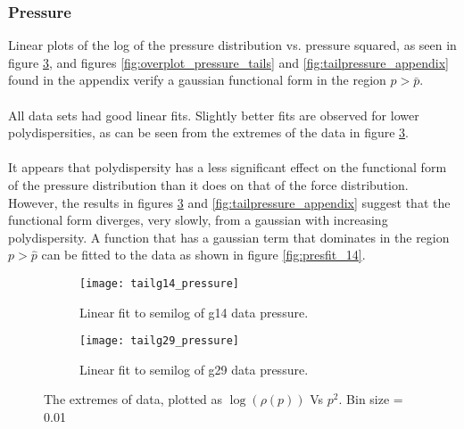\documentclass[12pt] {article} %
\begin{document}
		
		\subsubsection{Pressure}		
		Linear plots of the log of the pressure distribution vs. pressure squared, as seen in figure \ref{fig:fits_pressure}, and  figures \ref{fig:overplot_pressure_tails} and \ref{fig:tailpressure_appendix} found in the appendix verify a gaussian functional form in the region $p>\bar{p}$. \\
		\\
		All data sets had good linear fits. Slightly better fits are observed for lower polydispersities, as can be seen from the extremes of the data in  figure \ref{fig:fits_pressure}.\\
		\\
				It appears that polydispersity has a less significant effect on the functional form of the pressure distribution than it does on that of the force distribution. However, the results in figures \ref{fig:fits_pressure} and \ref{fig:tailpressure_appendix} suggest that the functional form diverges, very slowly, from a gaussian with increasing polydispersity. A function that has a gaussian term that dominates in the region $p>\hat{p}$ can be fitted to the data as shown in figure \ref{fig:presfit_14}.
		
			
		
		\begin{figure}[H]
						\centering
					\begin{subfigure}[h]{0.49\textwidth}
						\centering
						\texttt{[image: tailg14\_pressure]}
						\caption{Linear fit to semilog of g14 data pressure.}
						\label{fig:tailg14_pressure}
					\end{subfigure}
					\hfill
					\begin{subfigure}[h]{0.49\textwidth}
						\centering
						\texttt{[image: tailg29\_pressure]}
						\caption{Linear fit to semilog of g29 data pressure.}
						\label{fig:tailg29_pressure}
					\end{subfigure} 
				\caption{The extremes of data, plotted as $\log(\rho(p))$ Vs $p^2$. Bin size = 0.01}
				\label{fig:fits_pressure}
				\end{figure}
		
\end{document}
